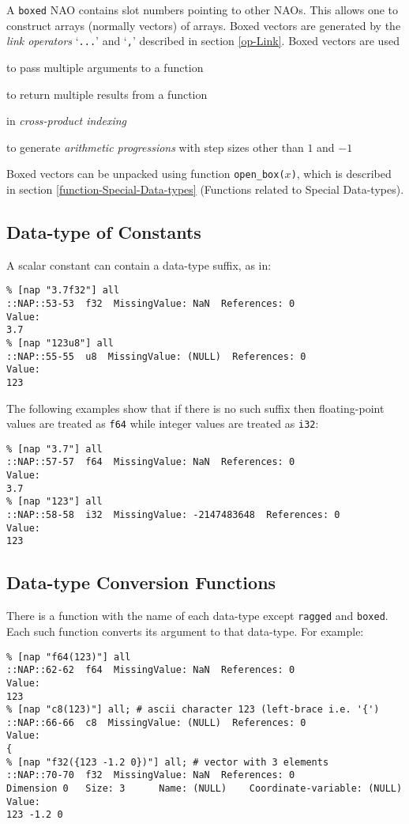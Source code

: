 A 
  \texttt{boxed} NAO contains slot numbers pointing to other NAOs.
  This allows one to construct arrays (normally vectors) of arrays.
  Boxed vectors are generated by the 
{\em link operators} `\texttt{...}' and `\texttt{,}' described in section
\ref{op-Link}.
Boxed vectors are used
\begin{bullets}
    \item to pass multiple arguments to a function
    \item to return multiple results from a function
    \item in 
    \emph{cross-product indexing}
    \item to generate 
    \emph{arithmetic progressions} with step sizes other than $1$ and $-1$
\end{bullets}
Boxed vectors can be unpacked using function 
  \texttt{open\_box(}$x$\texttt{)}, which is described in 
section \ref{function-Special-Data-types} (Functions related to Special Data-types).

\subsection{Data-type of Constants}
    \label{data-type-constant}

A scalar constant can contain a data-type suffix, as in:
  \begin{verbatim}
% [nap "3.7f32"] all
::NAP::53-53  f32  MissingValue: NaN  References: 0
Value:
3.7
% [nap "123u8"] all
::NAP::55-55  u8  MissingValue: (NULL)  References: 0
Value:
123
\end{verbatim}

The following examples show that if there is no such suffix then
floating-point values are treated as 
  \texttt{f64} while integer values are treated as 
  \texttt{i32}:
  \begin{verbatim}
% [nap "3.7"] all
::NAP::57-57  f64  MissingValue: NaN  References: 0
Value:
3.7
% [nap "123"] all
::NAP::58-58  i32  MissingValue: -2147483648  References: 0
Value:
123
\end{verbatim}

\subsection{Data-type Conversion Functions}
    \label{data-type-functions}

There is a function with the name of each data-type except 
  \texttt{ragged} and 
  \texttt{boxed}. Each such function converts its argument to that
  data-type. For example:
  \begin{verbatim}
% [nap "f64(123)"] all
::NAP::62-62  f64  MissingValue: NaN  References: 0
Value:
123
% [nap "c8(123)"] all; # ascii character 123 (left-brace i.e. '{')
::NAP::66-66  c8  MissingValue: (NULL)  References: 0
Value:
{
% [nap "f32({123 -1.2 0})"] all; # vector with 3 elements
::NAP::70-70  f32  MissingValue: NaN  References: 0
Dimension 0   Size: 3      Name: (NULL)    Coordinate-variable: (NULL)
Value:
123 -1.2 0
\end{verbatim}

